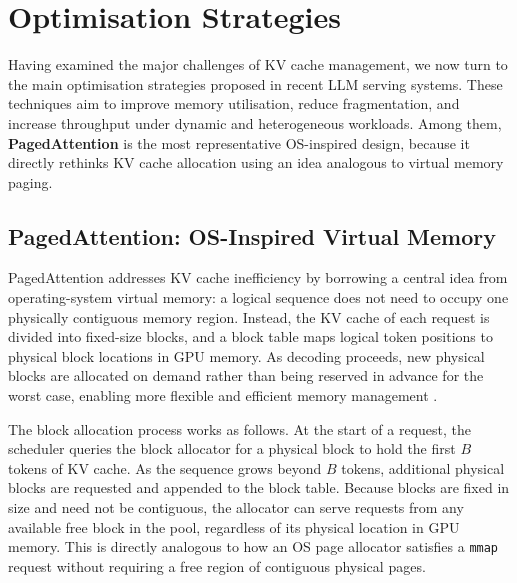 \documentclass[10pt, a4paper]{article}
\begin{document}
\section{Optimisation Strategies}
\label{sec:strategies}

Having examined the major challenges of KV cache management, we now
turn to the main optimisation strategies proposed in recent LLM serving
systems.
These techniques aim to improve memory utilisation, reduce fragmentation,
and increase throughput under dynamic and heterogeneous workloads.
Among them, \textbf{PagedAttention} is the most representative
OS-inspired design, because it directly rethinks KV cache allocation
using an idea analogous to virtual memory paging.


\subsection{PagedAttention: OS-Inspired Virtual Memory}

PagedAttention addresses KV cache inefficiency by borrowing a central
idea from operating-system virtual memory: a logical sequence does not
need to occupy one physically contiguous memory region.
Instead, the KV cache of each request is divided into fixed-size blocks,
and a block table maps logical token positions to physical block
locations in GPU memory.
As decoding proceeds, new physical blocks are allocated on demand rather
than being reserved in advance for the worst case, enabling more
flexible and efficient memory management \cite{kwon2023vllm}.

The block allocation process works as follows.
At the start of a request, the scheduler queries the block allocator
for a physical block to hold the first $B$ tokens of KV cache.
As the sequence grows beyond $B$ tokens, additional physical blocks are
requested and appended to the block table.
Because blocks are fixed in size and need not be contiguous, the
allocator can serve requests from any available free block in the pool,
regardless of its physical location in GPU memory.
This is directly analogous to how an OS page allocator satisfies a
\texttt{mmap} request without requiring a free region of contiguous
physical pages.
\end{document}
